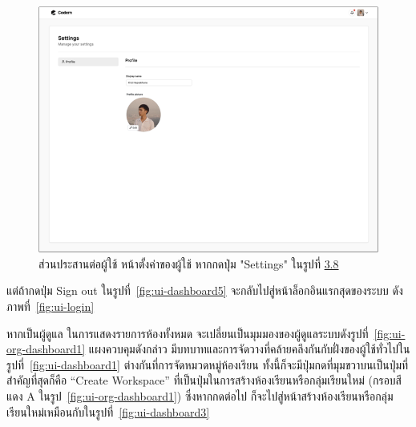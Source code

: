 \documentclass[12pt,oneside,openright,a4paper]{cpe-thai-project}
\begin{document}
    \hypertarget{ui-settings}{
        \begin{figure}[H]
        \centering
            \includegraphics[width=15cm]{figure/ui/ui-settings.png}
            \caption[ส่วนประสานต่อผู้ใช้ หน้าตั้งค่าของผู้ใช้]{ส่วนประสานต่อผู้ใช้ หน้าตั้งค่าของผู้ใช้ หากกดปุ่ม "Settings" ในรูปที่ \hyperlink{ui-dashboard5}{3.8}}
            \label{fig:ui-settings}
        \end{figure}
    }
    \begin{flushleft}
    แต่ถ้ากดปุ่ม Sign out ในรูปที่~\ref{fig:ui-dashboard5} จะกลับไปสู่หน้าล็อกอินแรกสุดของระบบ ดังภาพที่~\ref{fig:ui-login}
    \end{flushleft}
    \pagebreak
    
    \begin{flushleft}
    หากเป็นผู้ดูแล ในการแสดงรายการห้องทั้งหมด จะเปลี่ยนเป็นมุมมองของผู้ดูแลระบบดังรูปที่~\ref{fig:ui-org-dashboard1} แผงควบคุมดังกล่าว มีบทบาทและการจัดวางที่คล้ายคลึงกันกับฝั่งของผู้ใช้ทั่วไปในรูปที่~\ref{fig:ui-dashboard1} ต่างกันที่การจัดหมวดหมู่ห้องเรียน ทั้งนี้ก็จะมีปุ่มกดที่มุมขวาบนเป็นปุ่มที่สำคัญที่สุดก็คือ “Create Workspace” ที่เป็นปุ่มในการสร้างห้องเรียนหรือกลุ่มเรียนใหม่ (กรอบสีแดง A ในรูป~\ref{fig:ui-org-dashboard1}) ซึ่งหากกดต่อไป ก็จะไปสู่หน้าสร้างห้องเรียนหรือกลุ่มเรียนใหม่เหมือนกับในรูปที่~\ref{fig:ui-dashboard3}
    \end{flushleft}
\end{document}
